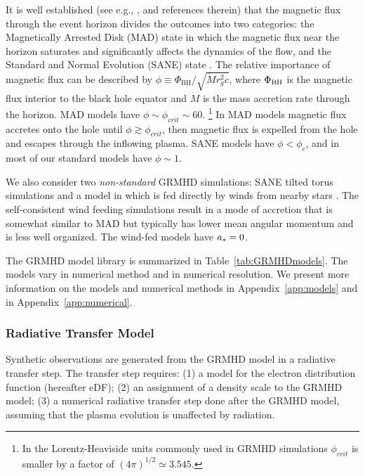 It is well established (see e.g., ,  and references therein) that the magnetic flux through the event horizon divides the outcomes into two categories: the Magnetically Arrested Disk (MAD) state \citep[e.g.,][]{bisnovatyi:1974,Igumenschchev:2003,2003PASJ...55L..69N} in which the magnetic flux near the horizon saturates and significantly affects the dynamics of the flow, and the Standard and Normal Evolution (SANE) state \citep[e.g.,][]{2003ApJ...589..444G, devilliers:2003, Narayan:2012}.  The relative importance of magnetic flux can be described by $\phi \equiv \Phi_{\mathrm{BH}}/ \sqrt{\dot{M} r_g^2 c}$, where $\Phi_{\rm BH}$ is the magnetic flux interior to the black hole equator and $\dot{M}$ is the mass accretion rate through the horizon. MAD models have $\phi \sim \phi_{crit} \sim 60$. \footnote{In the Lorentz-Heaviside units commonly used in GRMHD simulations $\phi_{crit}$ is smaller by a factor of $(4\pi)^{1/2} \simeq 3.545$.}  In MAD models magnetic flux accretes onto the hole until $\phi \gtrsim \phi_{crit}$, then magnetic flux is expelled from the hole and escapes through the inflowing plasma.  SANE models have $\phi < \phi_c$, and in most of our standard models have $\phi \sim 1$.

We also consider two {\it non-standard} GRMHD simulations: SANE tilted torus simulations \citep{ref} and a model in which \sgra is fed directly by winds from nearby stars \sgra \citep{2020ApJ...896L...6R}. The self-consistent wind feeding simulations result in a mode of accretion that is somewhat similar to MAD but typically has lower mean angular momentum and is less well organized.
The wind-fed models have $a_* = 0$.

The GRMHD model library is summarized in Table~\ref{tab:GRMHDmodels}. The models vary in numerical method and in numerical resolution. We present more information on the models and numerical methods in Appendix~\ref{app:models} and in  Appendix~\ref{app:numerical}.

\subsubsection{Radiative Transfer Model}

Synthetic observations are generated from the GRMHD model in a radiative transfer step.  The transfer step requires: (1) a model for the electron distribution function (hereafter eDF); (2) an assignment of a density scale to the GRMHD model; (3) a numerical radiative transfer step done after the GRMHD model, assuming that the plasma evolution is unaffected by radiation.

